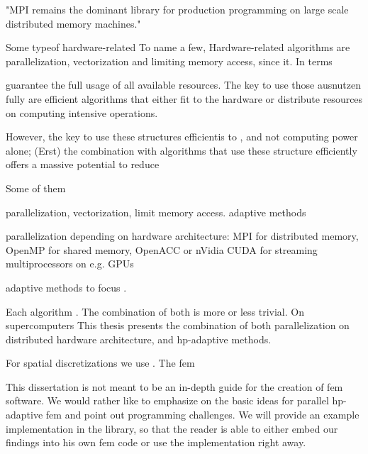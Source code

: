 "MPI remains the dominant library for production programming on large scale distributed memory machines."

Some typeof hardware-related 
To name a few, Hardware-related algorithms are parallelization, vectorization and limiting memory access, since it. In terms 


guarantee the full usage of all available resources. The key to use those ausnutzen fully are efficient algorithms that either fit to the hardware or distribute resources on computing intensive operations.

However, the key to use these structures efficientis to , and not computing power alone; (Erst) the combination with algorithms that use these structure efficiently offers a massive potential to reduce 




Some of them

parallelization, vectorization, limit memory access. adaptive methods

parallelization depending on hardware architecture: MPI for distributed memory, OpenMP for shared memory, OpenACC or nVidia CUDA for streaming multiprocessors on e.g. GPUs

adaptive methods to focus .


Each algorithm . The combination of both is more or less trivial.
On supercomputers
This thesis presents the combination of both parallelization on distributed hardware architecture, and hp-adaptive methods.

For spatial discretizations we use . The \gls{fem}


This dissertation is not meant to be an in-depth guide for the creation of \gls{fem} software. We would rather like to emphasize on the basic ideas for parallel hp-adaptive \gls{fem} and point out programming challenges. We will provide an example implementation in the \dealii{} library, so that the reader is able to either embed our findings into his own \gls{fem} code or use the \dealii{} implementation right away.